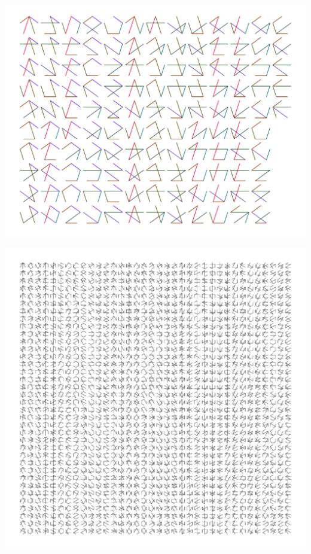 \documentclass[20pt]{beamer}
\begin{document}

\begin{frame}[plain]
\Large
\begin{center}
\includegraphics[scale=.7]{Figures/n4MST.pdf}
\end{center}
\end{frame}


\begin{frame}[plain]
\Large
\begin{center}
\includegraphics[scale=.7]{Figures/n5MST.pdf}
\end{center}
\end{frame}
\end{document}
